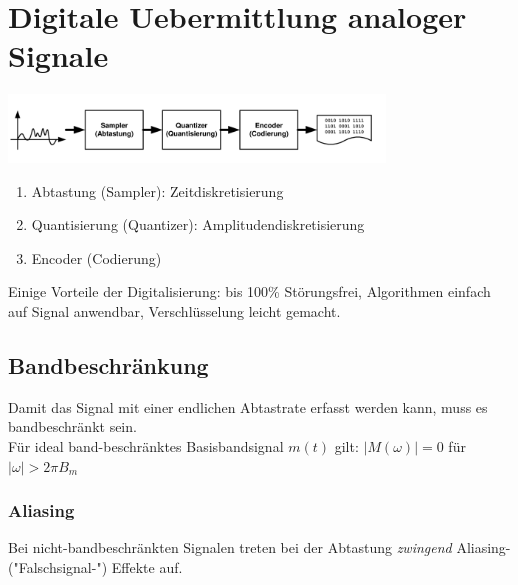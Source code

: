 \section{Digitale Uebermittlung analoger Signale }

\begin{center}
	\includegraphics[width=10cm]{bilder/dig_pcm_blockdiagramm.png}
\end{center}
\begin{enumerate}
  \item Abtastung (Sampler): Zeitdiskretisierung 
  \item Quantisierung (Quantizer): Amplitudendiskretisierung
  \item Encoder (Codierung)
\end{enumerate}

Einige Vorteile der Digitalisierung: bis 100\% Störungsfrei, Algorithmen
einfach auf Signal anwendbar, Verschlüsselung leicht gemacht.

\subsection{Bandbeschränkung}
	Damit das Signal mit einer endlichen Abtastrate erfasst werden kann, muss es bandbeschr\"ankt sein.\\
	F\"ur ideal band-beschränktes Basisbandsignal $m(t)$ gilt: $|M(\omega)| = 0$ für $|\omega| > 2\pi B_m$ 
\subsubsection{Aliasing}
	Bei nicht-bandbeschränkten Signalen treten bei der Abtastung \textit{zwingend} Aliasing-("Falschsignal-") Effekte auf.

